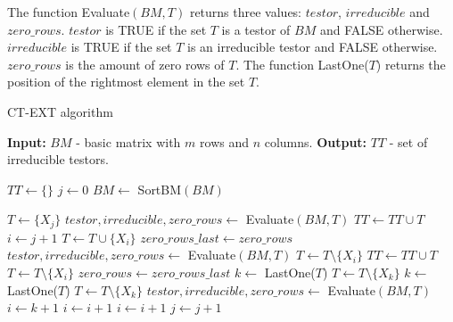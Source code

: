 \documentclass[authoryear,preprint,review,12pt]{elsarticle}
\begin{document}
The function Evaluate$(BM,T)$ returns three values: $testor$, $irreducible$ and $zero\_rows$. $testor$ is TRUE if the set $T$ is a testor of $BM$ and FALSE otherwise. $irreducible$ is TRUE if the set $T$ is an irreducible testor and FALSE otherwise. $zero\_rows$ is the amount of zero rows of $T$. The function LastOne($T$) returns the 
position of the rightmost element in the set $T$.

\begin{algorithm}
	\begin{spacing}{1.0}
	\begin{small}	
	\caption{CT-EXT algorithm}\label{ctext_algo}
	\begin{algorithmic}[1]	
		\State \textbf{Input: } $BM$ - basic matrix with $m$ rows and $n$ columns.
		\State \textbf{Output: } $TT$ - set of irreducible testors.
			
			\State $TT \gets \{\}$
			\State $j \gets 0$ 
			\State $BM \gets$ SortBM$(BM)$
			
			\label{row1condition}
				\State $T \gets \{X_j\}$ 
				\State $testor, irreducible, zero\_rows \gets$ Evaluate$(BM,T)$
					 
						\State $TT \gets TT \cup T$
					\EndIf
				\Else
					\State $i \gets j+1$
						\State $T \gets T \cup \{X_i\}$
						\State $zero\_rows\_last \gets zero\_rows$
						\State $testor, irreducible, zero\_rows \gets$ Evaluate$(BM,T)$
							\State $T \gets T \setminus \{X_i\}$ 
						\Else
									\State $TT \gets TT \cup T$
								\EndIf
								\State $T \gets T \setminus \{X_i\}$
								\State $zero\_rows \gets zero\_rows\_last$
							\EndIf
						\EndIf
							\State $k \gets$ LastOne($T$)
								\State $T \gets T \setminus \{X_k\}$
								\State $k \gets$ LastOne($T$)
							\EndIf
							\If{$k \neq j$}
								\State $T \gets T \setminus \{X_k\}$
								\State $testor, irreducible, zero\_rows \gets$ Evaluate$(BM,T)$
								\State $i \gets k+1$
							\Else
								\State $i \gets i+1$
							\EndIf
						\Else
							\State $i \gets i+1$
						\EndIf
					\EndWhile
				\EndIf
				\State $j \gets j+1$
			\EndWhile
	\end{algorithmic}
	\end{small}
	\end{spacing}
\end{algorithm}
\end{document}
